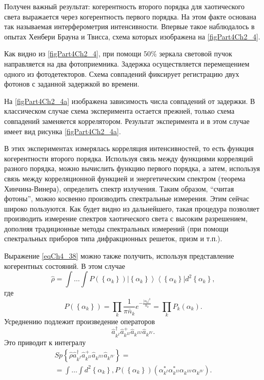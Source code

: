 Получен важный результат: когерентность второго порядка для
хаотического света выражается через когерентность первого порядка. На
этом факте основана так называемая интерферометрия
интенсивности. Впервые такое наблюдалось в опытах Хенбери Брауна и
Твисса, схема которых изображена на \autoref{figPart4Ch2_4}.



Как видно из \autoref{figPart4Ch2_4}, при помощи 50\% зеркала
световой пучок направляется на два фотоприемника. Задержка
осуществляется перемещением одного из фотодетекторов. Схема совпадений
фиксирует регистрацию двух фотонов с заданной задержкой во времени.



На \autoref{figPart4Ch2_4a} изображена зависимость числа совпадений
от задержки. В классическом случае схема эксперимента остается прежней,
только схема совпадений заменяется коррелятором. Результат
эксперимента и в этом случае имеет вид рисунка \ref{figPart4Ch2_4a}. 

В этих экспериментах измерялась корреляция интенсивностей, то есть 
функция когерентности второго порядка. Используя связь между функциями
корреляций разного порядка, можно вычислить функцию первого порядка, а
затем, используя связь между корреляционной функцией и энергетическим
спектром (теорема Хинчина-Винера), определить спектр излучения. Таким
образом, ``считая фотоны'', можно косвенно производить спектральные
измерения. Этим сейчас широко пользуются. Как будет видно из
дальнейшего, такая процедура позволяет производить измерение спектров
хаотического света с высоким разрешением, дополняя традиционные методы
спектральных измерений (при помощи спектральных приборов типа
дифракционных решеток, призм и т.п.). 

Выражение \eqref{eqCh4_38} можно также получить, используя
представление когерентных состояний. В этом случае
\begin{equation}
\hat{\rho} = \int \dots \int P\left(\left\{\alpha_k\right\}\right)
\left|\left\{\alpha_k\right\}\right>\left<\left\{\alpha_k\right\}\right|d^2 \left\{\alpha_k\right\},
\nonumber
\end{equation}
где
\begin{equation}
P\left(\left\{\alpha_k\right\}\right) = \prod_k\frac{1}{\pi
  \bar{n}_k}e^{-\frac{\left|\alpha_k\right|^2}{\bar{n}_k}}=
\prod_k P_k\left(\alpha_k\right).
\nonumber
\end{equation} 
Усреднению подлежит произведение операторов
\begin{equation}
\hat{a}^{\dag}_{k^{I}}\hat{a}^{+}_{k^{II}}\hat{a}_{k^{III}}\hat{a}_{k^{IV}}.
\nonumber
\end{equation}
Это приводит к интегралу
\begin{eqnarray}
Sp \left\{
\hat{\rho}
\hat{a}^{\dag}_{k^{I}}\hat{a}^{+}_{k^{II}}\hat{a}_{k^{III}}\hat{a}_{k^{IV}}
\right\} = 
\nonumber \\
= 
\int \dots \int 
d^2 \left\{\alpha_k\right\},
P\left(\left\{\alpha_k\right\}\right)
\left(
\alpha^{*}_{k^{I}}\alpha^{*}_{k^{II}}\alpha_{k^{III}}\alpha_{k^{IV}}
\right).
\nonumber
\end{eqnarray}

